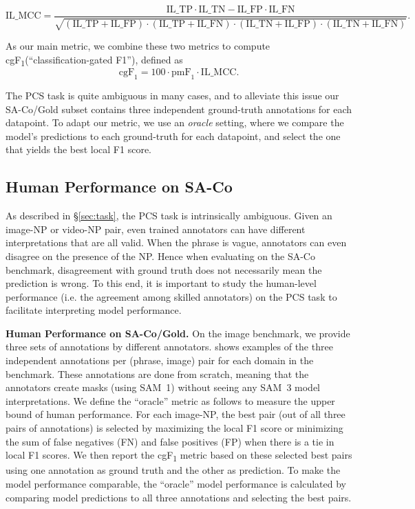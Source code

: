 \documentclass[]{fairmeta}
\newcommand{\samone}{SAM~1\xspace}
\newcommand{\model}{SAM~3\xspace}
\newcommand{\task}{PCS\xspace}
\newcommand{\dsname}{{SA-Co}\xspace}
\newcommand{\evalgold}{{\dsname/Gold}\xspace}
\newcommand{\cgf}{cgF\textsubscript{1}\xspace}
\renewcommand{\paragraph}[1]{%
	\noindent\textbf{#1.}\noindent\xspace%
}
\begin{document}
\begin{itemize}
\begin{equation}\label{eqn:ilmcc}
\mathrm{IL\_MCC} = \frac{\mathrm{IL\_TP}\cdot\mathrm{IL\_TN} - \mathrm{IL\_FP}\cdot\mathrm{IL\_FN}}{\sqrt{(\mathrm{IL\_TP} + \mathrm{IL\_FP})\cdot(\mathrm{IL\_TP} + \mathrm{IL\_FN})\cdot(\mathrm{IL\_TN} + \mathrm{IL\_FP})\cdot(\mathrm{IL\_TN} + \mathrm{IL\_FN})}}.
\end{equation}
\end{itemize}
As our main metric, we combine these two metrics to compute  
\cgf (``classification-gated F1''), defined as 
\begin{equation}\label{eqn:cgf}
\mathrm{cgF}_1 = 100 \cdot \mathrm{pmF}_1 \cdot \mathrm{IL\_MCC}.
\end{equation}

The PCS task is quite ambiguous in many cases, and to alleviate this issue our \evalgold subset contains three independent ground-truth annotations for each datapoint. To adapt our metric, we use an \emph{oracle} setting, where we compare the model's predictions to each ground-truth for each datapoint, and select the one that yields the best local F1 score.

\subsection{Human Performance on \dsname} \label{app:human_perf}

As described in \S\ref{sec:task}, the \task task is intrinsically ambiguous. Given an image-NP or video-NP pair, even trained annotators can have different interpretations that are all valid. When the phrase is vague, annotators can even disagree on the presence of the NP. Hence when evaluating on the \dsname benchmark, disagreement with ground truth does not necessarily mean the prediction is wrong. To this end, it is important to study the human-level performance (i.e. the agreement among skilled annotators) on the \task task to facilitate interpreting model performance.

\paragraph{Human Performance on \evalgold} On the image benchmark, we provide three sets of annotations by different annotators.  shows examples of the three independent annotations per (phrase, image) pair for each domain in the benchmark. These annotations are done from scratch, meaning that the annotators create masks (using \samone) without seeing any \model model interpretations. We define the “oracle” metric as follows to measure the upper bound of human performance. For each image-NP, the best pair (out of all three pairs of annotations) is selected by maximizing the local F1 score or minimizing the sum of false negatives (FN) and false positives (FP) when there is a tie in local F1 scores. We then report the \cgf metric based on these selected best pairs using one annotation as ground truth and the other as prediction. To make the model performance comparable, the “oracle” model performance is calculated by comparing model predictions to all three annotations and selecting the best pairs. 
\end{document}
